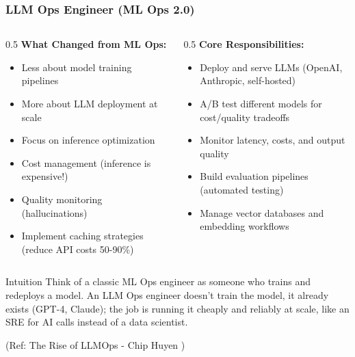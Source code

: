 \begin{frame}[fragile]\frametitle{LLM Ops Engineer (ML Ops 2.0)}
\begin{columns}
\begin{column}[T]{0.5\linewidth}
\textbf{What Changed from ML Ops:}
\begin{itemize}
\item Less about model training pipelines
\item More about LLM deployment at scale
\item Focus on inference optimization
\item Cost management (inference is expensive!)
\item Quality monitoring (hallucinations)
\item Implement caching strategies (reduce API costs 50-90\%)
\end{itemize}
\end{column}
\begin{column}[T]{0.5\linewidth}
\textbf{Core Responsibilities:}
\begin{itemize}
\item Deploy and serve LLMs (OpenAI, Anthropic, self-hosted)
\item A/B test different models for cost/quality tradeoffs
\item Monitor latency, costs, and output quality
\item Build evaluation pipelines (automated testing)
\item Manage vector databases and embedding workflows
\end{itemize}

    \end{column}
\end{columns}

\vspace{0.3cm}
\begin{block}{Intuition}
Think of a classic ML Ops engineer as someone who trains and redeploys a model. An LLM Ops engineer doesn't train the model, it already exists (GPT-4, Claude); the job is running it cheaply and reliably at scale, like an SRE for AI calls instead of a data scientist.
\end{block}

{\tiny (Ref: The Rise of LLMOps - Chip Huyen )}
\end{frame}


